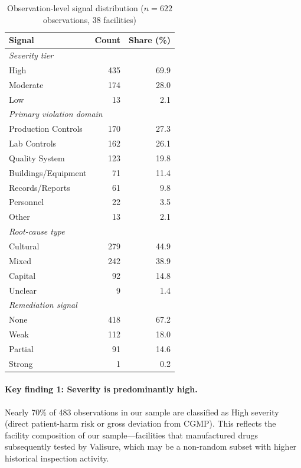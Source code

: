 \documentclass[12pt]{article}
\begin{document}
\begin{table}[h!]
\centering
\caption{Observation-level signal distribution ($n = 622$ observations,
         38 facilities)}
\label{tab:obs_desc}
\begin{tabular}{lrr}
\toprule
\textbf{Signal} & \textbf{Count} & \textbf{Share (\%)} \\
\midrule
\multicolumn{3}{l}{\textit{Severity tier}} \\
\quad High      & 435 & 69.9 \\
\quad Moderate  & 174 & 28.0 \\
\quad Low       &  13 &  2.1 \\
\midrule
\multicolumn{3}{l}{\textit{Primary violation domain}} \\
\quad Production Controls  & 170 & 27.3 \\
\quad Lab Controls         & 162 & 26.1 \\
\quad Quality System       & 123 & 19.8 \\
\quad Buildings/Equipment  &  71 & 11.4 \\
\quad Records/Reports      &  61 &  9.8 \\
\quad Personnel            &  22 &  3.5 \\
\quad Other                &  13 &  2.1 \\
\midrule
\multicolumn{3}{l}{\textit{Root-cause type}} \\
\quad Cultural  & 279 & 44.9 \\
\quad Mixed     & 242 & 38.9 \\
\quad Capital   &  92 & 14.8 \\
\quad Unclear   &   9 &  1.4 \\
\midrule
\multicolumn{3}{l}{\textit{Remediation signal}} \\
\quad None    & 418 & 67.2 \\
\quad Weak    & 112 & 18.0 \\
\quad Partial &  91 & 14.6 \\
\quad Strong  &   1 &  0.2 \\
\bottomrule
\end{tabular}
\end{table}

\paragraph{Key finding 1: Severity is predominantly high.}
Nearly 70\% of 483 observations in our sample are classified as High severity
(direct patient-harm risk or gross deviation from CGMP).
This reflects the facility composition of our sample—facilities that
manufactured drugs subsequently tested by Valisure, which may be a
non-random subset with higher historical inspection activity.
\end{document}
